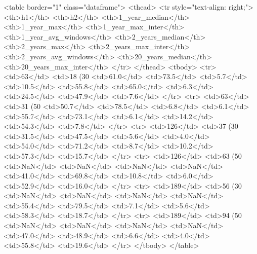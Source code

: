 <table border="1" class="dataframe">
  <thead>
    <tr style="text-align: right;">
      <th>h1</th>
      <th>h2</th>
      <th>1_year_median</th>
      <th>1_year_max</th>
      <th>1_year_max_inter</th>
      <th>1_year_avg_windows</th>
      <th>2_years_median</th>
      <th>2_years_max</th>
      <th>2_years_max_inter</th>
      <th>2_years_avg_windows</th>
      <th>20_years_median</th>
      <th>20_years_max_inter</th>
    </tr>
  </thead>
  <tbody>
    <tr>
      <td>63</td>
      <td>18 (30%
      <td>61.0</td>
      <td>73.5</td>
      <td>5.7</td>
      <td>10.5</td>
      <td>55.8</td>
      <td>65.0</td>
      <td>6.3</td>
      <td>24.5</td>
      <td>47.9</td>
      <td>7.6</td>
    </tr>
    <tr>
      <td>63</td>
      <td>31 (50%
      <td>50.7</td>
      <td>78.5</td>
      <td>6.8</td>
      <td>6.1</td>
      <td>55.7</td>
      <td>73.1</td>
      <td>6.1</td>
      <td>14.2</td>
      <td>54.3</td>
      <td>7.8</td>
    </tr>
    <tr>
      <td>126</td>
      <td>37 (30%
      <td>31.5</td>
      <td>47.5</td>
      <td>5.6</td>
      <td>4.0</td>
      <td>54.0</td>
      <td>71.2</td>
      <td>8.7</td>
      <td>10.2</td>
      <td>57.3</td>
      <td>15.7</td>
    </tr>
    <tr>
      <td>126</td>
      <td>63 (50%
      <td>NaN</td>
      <td>NaN</td>
      <td>NaN</td>
      <td>NaN</td>
      <td>41.0</td>
      <td>69.8</td>
      <td>10.8</td>
      <td>6.0</td>
      <td>52.9</td>
      <td>16.0</td>
    </tr>
    <tr>
      <td>189</td>
      <td>56 (30%
      <td>NaN</td>
      <td>NaN</td>
      <td>NaN</td>
      <td>NaN</td>
      <td>55.4</td>
      <td>79.5</td>
      <td>7.1</td>
      <td>5.6</td>
      <td>58.3</td>
      <td>18.7</td>
    </tr>
    <tr>
      <td>189</td>
      <td>94 (50%
      <td>NaN</td>
      <td>NaN</td>
      <td>NaN</td>
      <td>NaN</td>
      <td>47.0</td>
      <td>48.9</td>
      <td>6.6</td>
      <td>4.0</td>
      <td>55.8</td>
      <td>19.6</td>
    </tr>
  </tbody>
</table>